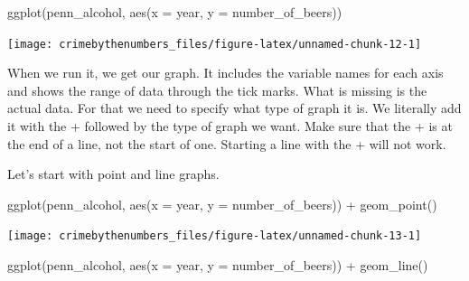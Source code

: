 \documentclass[
  12pt,
  openany]{book}
\newenvironment{Shaded}{\begin{snugshade}}{\end{snugshade}}
\newcommand{\AttributeTok}[1]{\textcolor[rgb]{0.61,0.61,0.61}{#1}}
\newcommand{\FunctionTok}[1]{\textcolor[rgb]{0,0,0}{#1}}
\newcommand{\NormalTok}[1]{#1}
\newcommand{\OtherTok}[1]{\textcolor[rgb]{0.37,0.37,0.37}{#1}}
\newcommand{\SpecialCharTok}[1]{\textcolor[rgb]{0,0,0}{#1}}
\begin{document}
\begin{Shaded}
\end{Shaded}

\begin{Shaded}
\begin{Highlighting}[]
\FunctionTok{ggplot}\NormalTok{(penn\_alcohol, }\FunctionTok{aes}\NormalTok{(}\AttributeTok{x =}\NormalTok{ year,}
                         \AttributeTok{y =}\NormalTok{ number\_of\_beers))}
\end{Highlighting}
\end{Shaded}

\begin{center}\texttt{[image: crimebythenumbers\_files/figure-latex/unnamed-chunk-12-1]} \end{center}

When we run it, we get our graph. It includes the variable names for each axis and shows the range of data through the tick marks. What is missing is the actual data. For that we need to specify what type of graph it is. We literally add it with the + followed by the type of graph we want. Make sure that the + is at the end of a line, not the start of one. Starting a line with the + will not work.

Let's start with point and line graphs.

\begin{Shaded}
\begin{Highlighting}[]
\FunctionTok{ggplot}\NormalTok{(penn\_alcohol, }\FunctionTok{aes}\NormalTok{(}\AttributeTok{x =}\NormalTok{ year, }\AttributeTok{y =}\NormalTok{ number\_of\_beers)) }\SpecialCharTok{+}
  \FunctionTok{geom\_point}\NormalTok{()}
\end{Highlighting}
\end{Shaded}

\begin{center}\texttt{[image: crimebythenumbers\_files/figure-latex/unnamed-chunk-13-1]} \end{center}

\begin{Shaded}
\begin{Highlighting}[]
\FunctionTok{ggplot}\NormalTok{(penn\_alcohol, }\FunctionTok{aes}\NormalTok{(}\AttributeTok{x =}\NormalTok{ year, }\AttributeTok{y =}\NormalTok{ number\_of\_beers)) }\SpecialCharTok{+}
  \FunctionTok{geom\_line}\NormalTok{()}
\end{Highlighting}
\end{Shaded}
\end{document}

